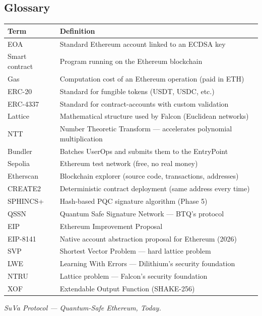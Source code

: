 \documentclass[11pt,a4paper]{article}
\begin{document}
\subsection{Glossary}

\begin{longtable}{@{}p{3cm}p{11cm}@{}}
\toprule
\textbf{Term} & \textbf{Definition} \\
\midrule
\endhead
EOA & Standard Ethereum account linked to an ECDSA key \\
Smart contract & Program running on the Ethereum blockchain \\
Gas & Computation cost of an Ethereum operation (paid in ETH) \\
ERC-20 & Standard for fungible tokens (USDT, USDC, etc.) \\
ERC-4337 & Standard for contract-accounts with custom validation \\
Lattice & Mathematical structure used by Falcon (Euclidean networks) \\
NTT & Number Theoretic Transform --- accelerates polynomial multiplication \\
Bundler & Batches UserOps and submits them to the EntryPoint \\
Sepolia & Ethereum test network (free, no real money) \\
Etherscan & Blockchain explorer (source code, transactions, addresses) \\
CREATE2 & Deterministic contract deployment (same address every time) \\
SPHINCS+ & Hash-based PQC signature algorithm (Phase 5) \\
QSSN & Quantum Safe Signature Network --- BTQ's protocol \\
EIP & Ethereum Improvement Proposal \\
EIP-8141 & Native account abstraction proposal for Ethereum (2026) \\
SVP & Shortest Vector Problem --- hard lattice problem \\
LWE & Learning With Errors --- Dilithium's security foundation \\
NTRU & Lattice problem --- Falcon's security foundation \\
XOF & Extendable Output Function (SHAKE-256) \\
\bottomrule
\end{longtable}

\vspace{2em}
\begin{center}
\textit{SuVa Protocol --- Quantum-Safe Ethereum, Today.}
\end{center}
\end{document}
